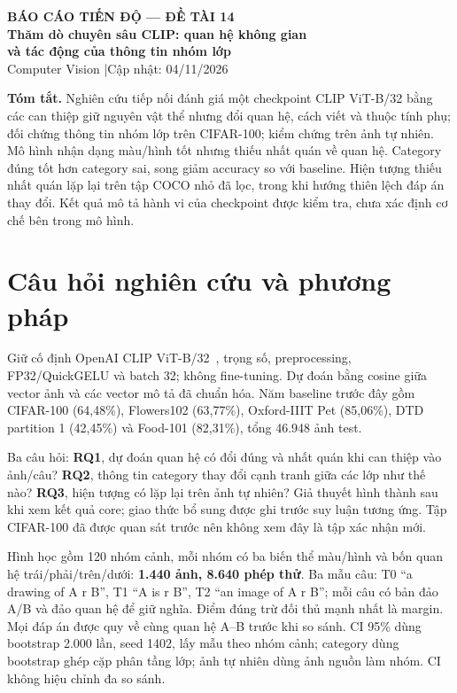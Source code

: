 \documentclass[11pt,a4paper]{article}
\begin{document}
\begin{center}
{\large\bfseries BÁO CÁO TIẾN ĐỘ — ĐỀ TÀI 14}\\[3pt]
{\Large\bfseries Thăm dò chuyên sâu CLIP: quan hệ không gian\\ và tác động của thông tin nhóm lớp}\\[4pt]
{\small Computer Vision \quad|\quad Cập nhật: 04/11/2026}
\end{center}
\vspace{-4pt}
\textbf{Tóm tắt.} Nghiên cứu tiếp nối đánh giá một checkpoint CLIP ViT-B/32 bằng các can thiệp giữ nguyên vật thể nhưng đổi quan hệ, cách viết và thuộc tính phụ; đối chứng thông tin nhóm lớp trên CIFAR-100; kiểm chứng trên ảnh tự nhiên. Mô hình nhận dạng màu/hình tốt nhưng thiếu nhất quán về quan hệ. Category đúng tốt hơn category sai, song giảm accuracy so với baseline. Hiện tượng thiếu nhất quán lặp lại trên tập COCO nhỏ đã lọc, trong khi hướng thiên lệch đáp án thay đổi. Kết quả mô tả hành vi của checkpoint được kiểm tra, chưa xác định cơ chế bên trong mô hình.

\section{Câu hỏi nghiên cứu và phương pháp}
Giữ cố định OpenAI CLIP ViT-B/32~\cite{clip}, trọng số, preprocessing, FP32/QuickGELU và batch 32; không fine-tuning. Dự đoán bằng cosine giữa vector ảnh và các vector mô tả đã chuẩn hóa. Năm baseline trước đây gồm CIFAR-100 (64,48\%), Flowers102 (63,77\%), Oxford-IIIT Pet (85,06\%), DTD partition 1 (42,45\%) và Food-101 (82,31\%), tổng 46.948 ảnh test.

Ba câu hỏi: \textbf{RQ1}, dự đoán quan hệ có đổi đúng và nhất quán khi can thiệp vào ảnh/câu? \textbf{RQ2}, thông tin category thay đổi cạnh tranh giữa các lớp như thế nào? \textbf{RQ3}, hiện tượng có lặp lại trên ảnh tự nhiên? Giả thuyết hình thành sau khi xem kết quả core; giao thức bổ sung được ghi trước suy luận tương ứng. Tập CIFAR-100 đã được quan sát trước nên không xem đây là tập xác nhận mới.

Hình học gồm 120 nhóm cảnh, mỗi nhóm có ba biến thể màu/hình và bốn quan hệ trái/phải/trên/dưới: \textbf{1.440 ảnh, 8.640 phép thử}. Ba mẫu câu: T0 ``a drawing of A r B'', T1 ``A is r B'', T2 ``an image of A r B''; mỗi câu có bản đảo A/B và đảo quan hệ để giữ nghĩa. Điểm đúng trừ đối thủ mạnh nhất là margin. Mọi đáp án được quy về cùng quan hệ A--B trước khi so sánh. CI 95\% dùng bootstrap 2.000 lần, seed 1402, lấy mẫu theo nhóm cảnh; category dùng bootstrap ghép cặp phân tầng lớp; ảnh tự nhiên dùng ảnh nguồn làm nhóm. CI không hiệu chỉnh đa so sánh.
\end{document}
